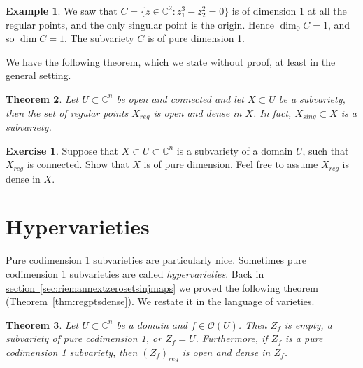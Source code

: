 \documentclass[12pt,openany]{book}
\newcommand{\C}{{\mathbb{C}}}
\newcommand{\sO}{{\mathscr{O}}}
\theoremstyle{plain}
\newtheorem{thm}{Theorem}[section]
\theoremstyle{remark}
\theoremstyle{definition}
\newenvironment{exbox}{%
    \def\FrameCommand{\vrule width 1pt \relax\hspace{10pt}}%
    \MakeFramed {\advance \hsize -\width \FrameRestore}%
}{%
    \endMakeFramed
}
\theoremstyle{exercise}
\newtheorem{exercise}{Exercise}[section]
\theoremstyle{example}
\newtheorem{example}[thm]{Example}
\newcommand{\sectionref}[1]{\hyperref[#1]{section~\ref*{#1}}}
\newcommand{\thmref}[1]{\hyperref[#1]{Theorem~\ref*{#1}}}
\begin{document}
\begin{example}
We saw that $C = \bigl\{ z \in \C^2 : z_1^3-z_2^2 = 0 \bigr\}$ is of
dimension 1 at all the regular points, and the only singular point is the
origin.  Hence $\dim_0 C = 1$, and so $\dim C = 1$.  The subvariety $C$ is
of pure dimension 1.
\end{example}


We have the following theorem, which we
state without proof, at least in the general setting.

\begin{thm}
Let $U \subset \C^n$ be open and connected and let $X \subset U$
be a subvariety, then the set of regular points $X_{\mathit{reg}}$
is open and dense in $X$.
In fact, $X_{\mathit{sing}} \subset X$ is a subvariety.
\end{thm}

\begin{exbox}
\begin{exercise}
Suppose that $X \subset U \subset \C^n$ is a subvariety
of a domain $U$, such that $X_{\mathit{reg}}$ is connected.  Show that $X$ is of
pure dimension.  Feel free to assume $X_{\mathit{reg}}$ is dense in $X$.
\end{exercise}
\end{exbox}


\section{Hypervarieties} \label{section:hypervarieties}


Pure codimension 1 subvarieties are particularly nice.
Sometimes pure codimension 1 subvarieties are called
\emph{hypervarieties}.
Back in \sectionref{sec:riemannextzerosetsinjmaps} we proved
the following theorem (\thmref{thm:regptsdense}).  We restate it in the
language of varieties.

\begin{thm} \label{thm:regptsdense2}
Let $U \subset \C^n$ be a domain and
$f \in \sO(U)$.  Then $Z_f$ is empty, a subvariety of pure codimension 1, or
$Z_f = U$.
Furthermore, if $Z_f$ is a pure codimension 1 subvariety, then
$(Z_f)_{\mathit{reg}}$ is open and dense in $Z_f$.
\end{thm}
\end{document}
